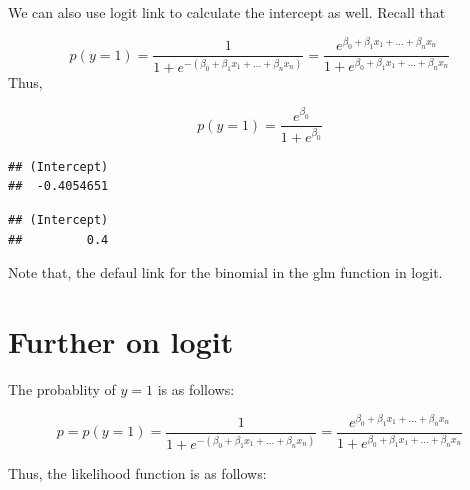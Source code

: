 \documentclass[
]{book}
\newenvironment{Shaded}{\begin{snugshade}}{\end{snugshade}}
\newcommand{\DataTypeTok}[1]{\textcolor[rgb]{0.13,0.29,0.53}{#1}}
\newcommand{\DecValTok}[1]{\textcolor[rgb]{0.00,0.00,0.81}{#1}}
\newcommand{\KeywordTok}[1]{\textcolor[rgb]{0.13,0.29,0.53}{\textbf{#1}}}
\newcommand{\NormalTok}[1]{#1}
\newcommand{\OperatorTok}[1]{\textcolor[rgb]{0.81,0.36,0.00}{\textbf{#1}}}
\newcommand{\StringTok}[1]{\textcolor[rgb]{0.31,0.60,0.02}{#1}}
\begin{document}
We can also use logit link to calculate the intercept as well. Recall that

\[p(y=1)=\frac{1}{1+e^{-(\beta_0+\beta_1x_1+...+\beta_nx_n)}}=\frac{e^{\beta_0+\beta_1x_1+...+\beta_nx_n}}{1+e^{\beta_0+\beta_1x_1+...+\beta_nx_n}}\]
Thus,

\[p(y=1)=\frac{e^{\beta_0}}{1+e^{\beta_0}}\]

\begin{Shaded}
\end{Shaded}

\begin{verbatim}
## (Intercept) 
##  -0.4054651
\end{verbatim}

\begin{Shaded}
\end{Shaded}

\begin{verbatim}
## (Intercept) 
##         0.4
\end{verbatim}

Note that, the defaul link for the binomial in the glm function in logit.

\hypertarget{further-on-logit}{%
\section{Further on logit}\label{further-on-logit}}

The probablity of \(y=1\) is as follows:

\[p=p(y=1)=\frac{1}{1+e^{-(\beta_0+\beta_1x_1+...+\beta_nx_n)}}=\frac{e^{\beta_0+\beta_1x_1+...+\beta_nx_n}}{1+e^{\beta_0+\beta_1x_1+...+\beta_nx_n}}\]

Thus, the likelihood function is as follows:
\end{document}

